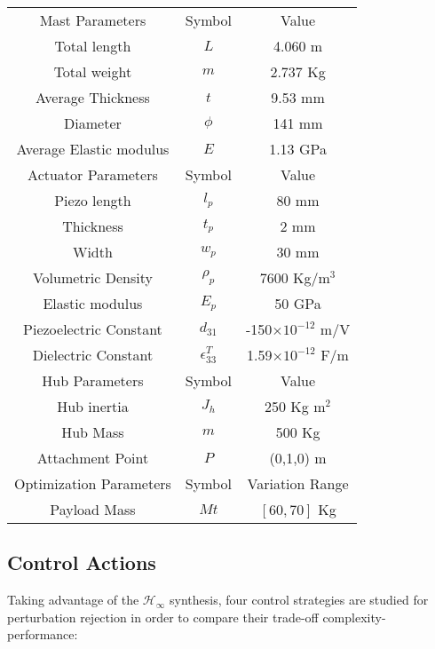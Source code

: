 \documentclass{ifacconf}
\begin{document}
\begin{table}
\caption{}
\begin{center}
\label{tab:parameters}
\begin{tabular}{c c c}
& & \\ \hline
\hline
Mast Parameters & Symbol & Value\\
\hline
Total length & $L$ & 4.060 m\\
Total weight& $m$ & 2.737 Kg\\
Average Thickness & $t$ & 9.53 mm \\
Diameter & $\phi$ & 141 mm \\
Average Elastic modulus & $E$ & 1.13 GPa \\
\hline
\hline
Actuator Parameters & Symbol & Value\\
\hline
Piezo length & $l_p$ & 80 mm\\
Thickness & $t_p$ & 2 mm \\
Width & $w_p$ & 30 mm \\
Volumetric Density & $\rho_p$ & 7600 Kg/m$^3$ \\
Elastic modulus & $E_p$ & 50 GPa \\
Piezoelectric Constant & $d_{31}$ & -150$\times 10^{-12}$ m/V \\
Dielectric Constant & $\epsilon_{33}^T$ & 1.59$\times 10^{-12}$ F/m \\
\hline
\hline
Hub Parameters & Symbol & Value\\
\hline
Hub inertia & $J_h$& 250 Kg m$^2$\\
Hub Mass & $m$& 500 Kg\\
Attachment Point & $P$& (0,1,0) m \\
\hline
\hline
Optimization Parameters & Symbol & Variation Range\\
\hline
Payload Mass & $Mt$ & $[60, 70]$ Kg \\
\hline
\hline
\end{tabular}
\end{center}
\end{table}

\subsection{Control Actions}

Taking advantage of the $\mathcal{H}_\infty$ synthesis, four control strategies are studied for perturbation rejection in order to compare their trade-off complexity-performance:
\end{document}
